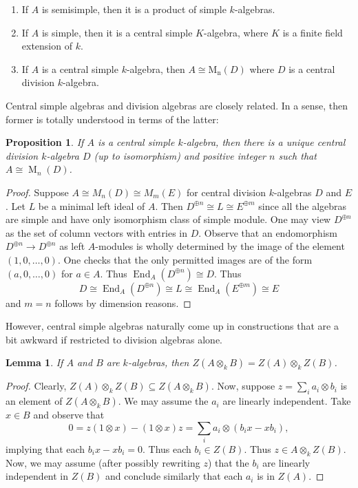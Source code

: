 \documentclass[12pt]{article}
\theoremstyle{plain}
\newtheorem{lemma}[theorem]{Lemma}
\newtheorem{proposition}[theorem]{Proposition}
\theoremstyle{definition}
\theoremstyle{remark}
\numberwithin{equation}{section}
\begin{document}
\begin{enumerate}
\item If $A$ is semisimple, then it is a product of simple $k$-algebras.
\item If $A$ is simple, then it is a central simple $K$-algebra, where
$K$ is a finite field extension of $k$.
\item If $A$ is a central simple $k$-algebra, then $A \cong
\operatorname{M_n}(D)$ where $D$ is a central division $k$-algebra.
\end{enumerate}

Central simple algebras and division algebras are closely related.
In a sense, then former is totally understood in terms of the latter:

\begin{proposition}
If $A$ is a central simple $k$-algebra, then there is a unique central
division $k$-algebra $D$ (up to isomorphism) and positive integer $n$
such that $A \cong \operatorname{M}_n(D)$.
\end{proposition}

\begin{proof}
Suppose $A \cong M_n(D) \cong M_m(E)$ for central division $k$-algebras
$D$ and $E$.
Let $L$ be a minimal left ideal of $A$.
Then $D^{\oplus n} \cong L \cong E^{\oplus m}$ since all the algebras
are simple and have only isomorphism class of simple module.
One may view $D^{\oplus n}$ as the set of column vectors with
entries in $D$.
Observe that an endomorphism $D^{\oplus n} \to D^{\oplus n}$
as left $A$-modules is wholly determined by the image of
the element $(1,0,\ldots,0)$.  One checks that the only
permitted images are of the form $(a,0,\ldots,0)$ for $a \in A$.
Thus $\operatorname{End}_A(D^{\oplus n}) \cong D$.
Thus
\[
D \cong \operatorname{End}_A(D^{\oplus n})
\cong L
\cong \operatorname{End}_A(E^{\oplus m}) \cong E
\]
and $m=n$ follows by dimension reasons.
\end{proof}

However, central simple algebras naturally come up in constructions that
are a bit awkward if restricted to division algebras alone.

\begin{lemma} \label{lem:center_of_tensor}
If $A$ and $B$ are $k$-algebras, then $Z(A \otimes_k B) = Z(A) \otimes_k
Z(B)$.
\end{lemma}

\begin{proof}
Clearly, $Z(A) \otimes_k Z(B) \subseteq Z(A \otimes_k B)$.
Now, suppose $z = \sum_i a_i \otimes b_i$ is an element of
$Z(A \otimes_k B)$.  We may assume the $a_i$ are linearly independent.
Take $x \in B$ and observe that
\[
0 = z(1 \otimes x) - (1 \otimes x)z =
\sum_i a_i \otimes (b_ix-xb_i),
\]
implying that each $b_ix-xb_i=0$.
Thus each $b_i \in Z(B)$.
Thus $z \in A \otimes_k Z(B)$.
Now, we may assume (after possibly rewriting $z$) that the $b_i$
are linearly independent in $Z(B)$
and conclude similarly that each $a_i$ is in $Z(A)$.
\end{proof}
\end{document}

